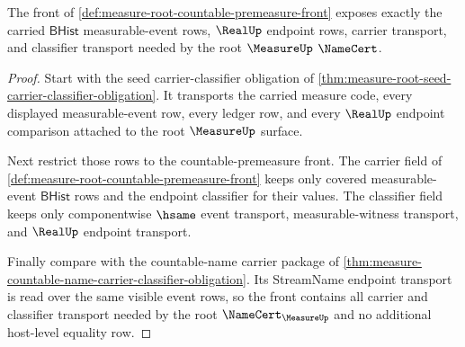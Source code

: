 \begin{theorem}
\label{thm:measure-root-countable-premeasure-carrier-obligation}
The front of \autoref{def:measure-root-countable-premeasure-front} exposes
exactly the carried $\mathsf{BHist}$ measurable-event rows, $\RealUp$ endpoint
rows, carrier transport, and classifier transport needed by the root
$\MeasureUp$ $\NameCert$.
\end{theorem}
\begin{proof}
Start with the seed carrier-classifier obligation of
\autoref{thm:measure-root-seed-carrier-classifier-obligation}. It transports
the carried measure code, every displayed measurable-event row, every ledger
row, and every $\RealUp$ endpoint comparison attached to the root
$\MeasureUp$ surface.

Next restrict those rows to the countable-premeasure front. The carrier field
of \autoref{def:measure-root-countable-premeasure-front} keeps only covered
measurable-event $\mathsf{BHist}$ rows and the endpoint classifier for their
values. The classifier field keeps only componentwise $\hsame$ event
transport, measurable-witness transport, and $\RealUp$ endpoint transport.

Finally compare with the countable-name carrier package of
\autoref{thm:measure-countable-name-carrier-classifier-obligation}. Its
StreamName endpoint transport is read over the same visible event rows, so the
front contains all carrier and classifier transport needed by the root
$\NameCert_{\MeasureUp}$ and no additional host-level equality row.
\end{proof}

